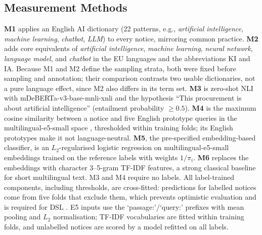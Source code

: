 \documentclass[runningheads]{llncs}
\begin{document}
\subsection{Measurement Methods}
\textbf{M1} applies an English AI dictionary (22 patterns, e.g., \textit{artificial intelligence}, \textit{machine learning}, \textit{chatbot}, \textit{LLM}) to every notice, mirroring common practice. \textbf{M2} adds core equivalents of \textit{artificial intelligence}, \textit{machine learning}, \textit{neural network}, \textit{language model}, and \textit{chatbot} in the EU languages and the abbreviations KI and IA. Because M1 and M2 define the sampling strata, both were fixed before sampling and annotation; their comparison contrasts two usable dictionaries, not a pure language effect, since M2 also differs in its term set. \textbf{M3} is zero-shot NLI with mDeBERTa-v3-base-mnli-xnli \cite{he2023,yin2019} and the hypothesis ``This procurement is about artificial intelligence'' (entailment probability $\ge 0.5$). \textbf{M4} is the maximum cosine similarity between a notice and five English prototype queries in the multilingual-e5-small space \cite{wang2024me5}, thresholded within training folds; its English prototypes make it not language-neutral. \textbf{M5}, the pre-specified embedding-based classifier, is an $L_2$-regularised logistic regression on multilingual-e5-small embeddings trained on the reference labels with weights $1/\pi_i$. \textbf{M6} replaces the embeddings with character 3--5-gram TF-IDF features, a strong classical baseline for short multilingual text. M3 and M4 require no labels. All label-trained components, including thresholds, are cross-fitted: predictions for labelled notices come from five folds that exclude them, which prevents optimistic evaluation and is required for DSL \cite{egami2023}. E5 inputs use the `passage:'/`query:' prefixes with mean pooling and $L_2$ normalisation; TF-IDF vocabularies are fitted within training folds, and unlabelled notices are scored by a model refitted on all labels.
\end{document}
